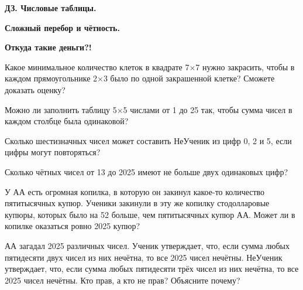 \centerline{\bf \Huge ДЗ. Числовые таблицы.} 

\centerline{\bf \Huge Сложный перебор и чётность.} 

\centerline{\bf \Huge }

\begin{flushright}
        \scriptsize{\textbf{Откуда такие деньги?!}}
\end{flushright}

 Какое минимальное количество клеток в квадрате 7$\times$7 нужно закрасить, чтобы в каждом прямоугольнике 2$\times$3 было по одной закрашенной клетке? Сможете доказать оценку?

 Можно ли заполнить таблицу 5$\times$5 числами от 1 до 25 так, чтобы сумма чисел в каждом столбце была одинаковой?

 Сколько шестизначных чисел может составить НеУченик из цифр 0, 2 и 5, если цифры могут повторяться?

 Сколько чётных чисел от 13 до 2025 имеют не больше двух одинаковых цифр?

 У АА есть огромная копилка, в которую он закинул какое-то количество пятитысячных купюр. Ученики закинули в эту же копилку стодолларовые купюры, которых было на 52 больше, чем пятитысячных купюр АА. Может ли в копилке оказаться ровно 2025 купюр?

 АА загадал 2025 различных чисел. Ученик утверждает, что, если сумма любых пятидесяти двух чисел из них нечётна, то все 2025 чисел нечётны. НеУченик утверждает, что, если сумма любых пятидесяти трёх чисел из них нечётна, то все 2025 чисел нечётны. Кто прав, а кто не прав? Объясните почему?